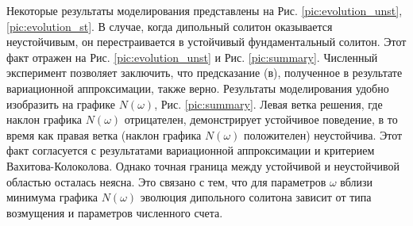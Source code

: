 Некоторые результаты моделирования представлены на Рис. \ref{pic:evolution_unst}, \ref{pic:evolution_st}.
В случае, когда дипольный солитон оказывается неустойчивым, он перестраивается в устойчивый фундаментальный солитон.
Этот факт отражен на Рис. \ref{pic:evolution_unst} и Рис. \ref{pic:summary}.
Численный эксперимент позволяет заключить, что предсказание (в), полученное в результате вариационной аппроксимации, также верно.
Результаты моделирования удобно изобразить на графике $N(\omega)$, Рис. \ref{pic:summary}.
Левая ветка решения, где наклон графика $N(\omega)$ отрицателен, демонстрирует устойчивое поведение, в то время как правая ветка (наклон графика $N(\omega)$ положителен) неустойчива.
Этот факт согласуется с результатами вариационной аппроксимации и критерием Вахитова-Колоколова.
Однако точная граница между устойчивой и неустойчивой областью осталась неясна.
Это связано с тем, что для параметров $\omega$ вблизи минимума графика $N(\omega)$ эволюция дипольного солитона зависит от типа возмущения и параметров численного счета.
%
